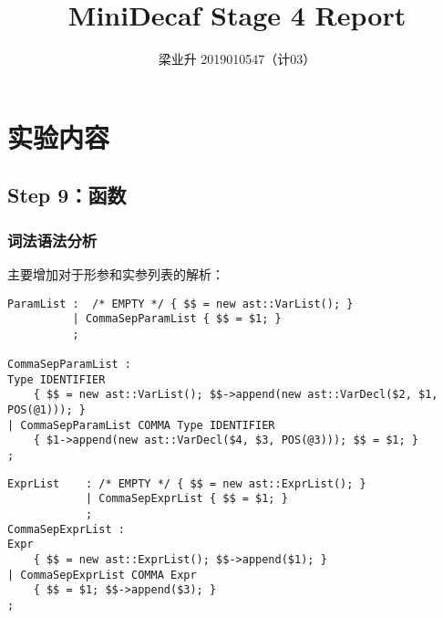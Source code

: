 \documentclass[a4paper]{article}
\author{梁业升 2019010547（计03）}
\begin{document}


\title{MiniDecaf Stage 4 Report}

\maketitle

\section{实验内容}

\subsection{Step 9：函数}

\subsubsection{词法语法分析}

主要增加对于形参和实参列表的解析：

\begin{lstlisting}[]
ParamList :  /* EMPTY */ { $$ = new ast::VarList(); }
          | CommaSepParamList { $$ = $1; }
          ;

CommaSepParamList :
Type IDENTIFIER
    { $$ = new ast::VarList(); $$->append(new ast::VarDecl($2, $1, POS(@1))); }
| CommaSepParamList COMMA Type IDENTIFIER
    { $1->append(new ast::VarDecl($4, $3, POS(@3))); $$ = $1; }
;
\end{lstlisting}

\begin{lstlisting}[]
ExprList    : /* EMPTY */ { $$ = new ast::ExprList(); }
            | CommaSepExprList { $$ = $1; }
            ;
CommaSepExprList :
Expr
    { $$ = new ast::ExprList(); $$->append($1); }
| CommaSepExprList COMMA Expr
    { $$ = $1; $$->append($3); }
;
\end{lstlisting}
\end{document}
